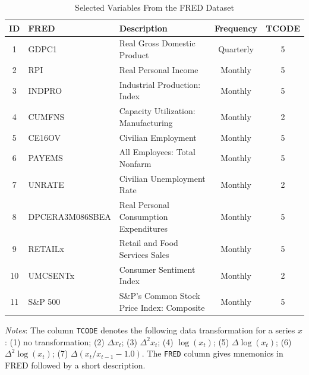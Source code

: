 \documentclass[11pt]{article}
\begin{document}
	\begin{table}[htbp]
		\small
		\centering
		\caption{Selected Variables From the FRED Dataset}
		\label{tab:VariablesUS}
		\begin{threeparttable}
			\renewcommand{\arraystretch}{1}
			\begin{tabular}{cllcc}
				\toprule
				ID & FRED & Description & Frequency & TCODE \\
				\midrule
				1  & GDPC1           & Real Gross Domestic Product                & Quarterly & 5 \\
				2  & RPI             & Real Personal Income                       & Monthly   & 5 \\
				3  & INDPRO          & Industrial Production: Index               & Monthly   & 5 \\
				4  & CUMFNS          & Capacity Utilization: Manufacturing        & Monthly   & 2 \\
				5  & CE16OV          & Civilian Employment                        & Monthly   & 5 \\
				6  & PAYEMS          & All Employees: Total Nonfarm               & Monthly   & 5 \\
				7  & UNRATE          & Civilian Unemployment Rate                 & Monthly   & 2 \\
				8  & DPCERA3M086SBEA & Real Personal Consumption Expenditures     & Monthly   & 5 \\
				9  & RETAILx         & Retail and Food Services Sales             & Monthly   & 5 \\
				10 & UMCSENTx        & Consumer Sentiment Index                   & Monthly   & 2 \\
				11 & S\&P 500        & S\&P's Common Stock Price Index: Composite & Monthly   & 5 \\
				\bottomrule
			\end{tabular}
			\begin{tablenotes}[flushleft]
				\footnotesize
				\item \textit{Notes}: The column \texttt{TCODE} denotes the following data transformation for a series $x$: (1) no transformation; (2) $\Delta x_t$; (3) $\Delta^2 x_t$; (4) $\log(x_t)$; (5) $\Delta \log(x_t)$; (6) $\Delta^2 \log(x_t)$; (7) $\Delta (x_t/x_{t-1} - 1.0)$. The \texttt{FRED} column gives mnemonics in FRED followed by a short description.
			\end{tablenotes}
		\end{threeparttable}
	\end{table}
	
\end{document}
